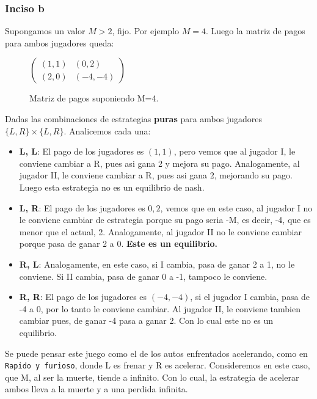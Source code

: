 \subsubsection{Inciso b}


Supongamos un valor $ M > 2$, fijo. Por ejemplo $M = 4$. Luego la matriz de pagos para ambos jugadores queda:

\vspace{0.5cm}
\begin{figure}[H]
  \centering	
$\begin{pmatrix}
	(1,1) & (0, 2) \\
	(2, 0) & (-4, -4)
\end{pmatrix} $
  \caption{Matriz de pagos suponiendo M=4.}
\end{figure}

\vspace{0.5cm}
Dadas las combinaciones de estrategias \textbf{puras} para ambos jugadores $\{L, R\} \times \{L, R\}$. Analicemos cada una:
\begin{itemize}
	\item \textbf{L, L}: El pago de los jugadores es $(1,1)$, pero vemos que al jugador I, le conviene cambiar a R, pues asi gana 2 y mejora su pago. Analogamente, al jugador II, le conviene cambiar a R, pues asi gana 2, mejorando su pago. Luego esta estrategia no es un equilibrio de nash.   
	\item \textbf{L, R}: El pago de los jugadores es $0, 2$, vemos que en este caso, al jugador I no le conviene cambiar de estrategia porque su pago seria -M, es decir, -4, que es menor que el actual, 2. Analogamente, al jugador II no le conviene cambiar porque pasa de ganar 2 a 0. \textbf{Este es un equilibrio.}
	\item \textbf{R, L}: Analogamente, en este caso, si I cambia, pasa de ganar 2 a 1, no le conviene. Si II cambia, pasa de ganar 0 a -1, tampoco le conviene.
	\item \textbf{R, R}: El pago de los jugadores es $(-4, -4)$, si el jugador I cambia, pasa de -4 a 0, por lo tanto le conviene cambiar. Al jugador II, le conviene tambien cambiar pues, de ganar -4 pasa a ganar 2. Con lo cual este no es un equilibrio.
\end{itemize}

Se puede pensar este juego como el de los autos enfrentados acelerando, como en \texttt{Rapido y furioso}, donde L es frenar y R es acelerar. Consideremos en este caso, que M, al ser la muerte, tiende a infinito. Con lo cual, la estrategia de acelerar ambos lleva a la muerte y a una perdida infinita.